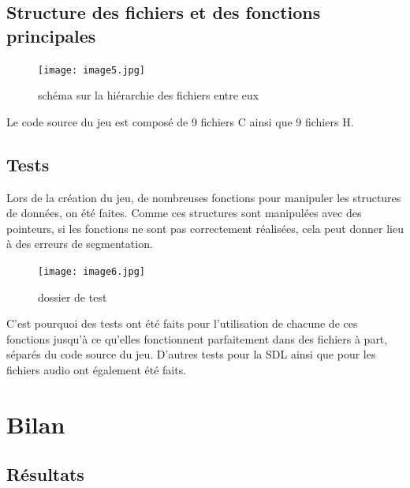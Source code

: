 \documentclass[a4paper,11pt]{article}
\begin{document}
\subsection{Structure des fichiers et des fonctions principales}
\begin{figure}[ht!]
\centering
\texttt{[image: image5.jpg]} 
\caption {\label{image8} schéma sur la hiérarchie des fichiers entre eux}
\end{figure}
 \smallbreak
Le code source du jeu est composé de 9 fichiers C ainsi que 9 fichiers H.

\subsection{Tests}
Lors de la création du jeu, de nombreuses fonctions pour manipuler les structures de données, on été faites. Comme ces structures sont manipulées avec des pointeurs, si les fonctions ne sont pas correctement réalisées, cela peut donner lieu à des erreurs de segmentation.
\begin{figure}[ht!]
\centering
\texttt{[image: image6.jpg]} 
\caption {\label{image9} dossier de test}
\end{figure}
 \smallbreak
C'est pourquoi des tests ont été faits pour l'utilisation de chacune de ces fonctions jusqu'à ce qu'elles fonctionnent parfaitement dans des fichiers à part, séparés du code source du jeu. D'autres tests pour la SDL ainsi que pour les fichiers audio ont également été faits.

\section{Bilan}
\subsection{Résultats}
\end{document}
